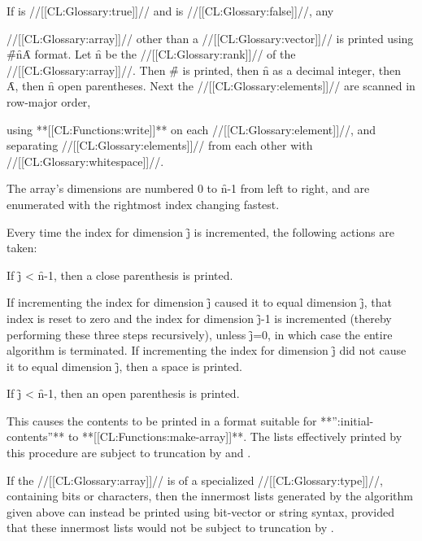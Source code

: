 
If   is //[[CL:Glossary:true]]//  and  is //[[CL:Glossary:false]]//, any

//[[CL:Glossary:array]]// other than a //[[CL:Glossary:vector]]// is printed using \f{\#}\f{n}\f{A} format. Let \f{n} be the //[[CL:Glossary:rank]]// of the //[[CL:Glossary:array]]//. Then \f{\#} is printed, then \f{n} as a decimal integer, then \f{A}, then \f{n} open parentheses.   Next the //[[CL:Glossary:elements]]// are scanned in row-major order,

using **[[CL:Functions:write]]** on each //[[CL:Glossary:element]]//,  and separating //[[CL:Glossary:elements]]// from each other with //[[CL:Glossary:whitespace]]//.

The array's dimensions are numbered 0 to \f{n}-1 from left to right, and are enumerated with the rightmost index changing fastest.

Every time the index for dimension \f{j} is incremented, the following actions are taken:

\beginlist \itemitem{\bull} If \f{j} < \f{n}-1, then a close parenthesis is printed.

\itemitem{\bull} If incrementing the index for dimension \f{j} caused it to equal dimension \f{j}, that index is reset to zero and the index for dimension \f{j}-1 is incremented (thereby performing these three steps recursively), unless \f{j}=0, in which case the entire algorithm is terminated. If incrementing the index for dimension \f{j} did not cause it to equal dimension \f{j}, then a space is printed.

\itemitem{\bull} If \f{j} < \f{n}-1, then an open parenthesis is printed. \endlist

This causes the contents to be printed in a format suitable for **'':initial-contents''** to **[[CL:Functions:make-array]]**. The lists effectively printed by this procedure are subject to truncation by  and .

If the //[[CL:Glossary:array]]//  is of a specialized //[[CL:Glossary:type]]//, containing bits or characters, then the innermost lists generated by the algorithm given above can instead be printed using bit-vector or string syntax, provided that these innermost lists would not be subject to truncation by .  


